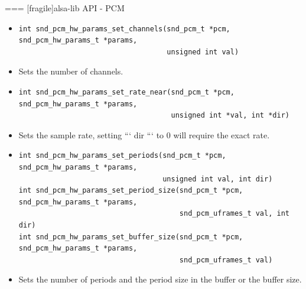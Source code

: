 === [fragile]{alsa-lib API - PCM}
  \begin{itemize}
  \item
    \begin{block}{}
    \fontsize{9}{9}\selectfont
      \begin{verbatim}
int snd_pcm_hw_params_set_channels(snd_pcm_t *pcm, snd_pcm_hw_params_t *params,
                                   unsigned int val)
      \end{verbatim}
    \end{block}
    \item Sets the number of channels.
  \item
    \begin{block}{}
    \fontsize{9}{9}\selectfont
      \begin{verbatim}
int snd_pcm_hw_params_set_rate_near(snd_pcm_t *pcm, snd_pcm_hw_params_t *params,
                                    unsigned int *val, int *dir)
      \end{verbatim}
    \end{block}
    \item Sets the sample rate, setting ``` dir ``` to 0 will require
      the exact rate.
  \item
    \begin{block}{}
    \fontsize{9}{9}\selectfont
      \begin{verbatim}
int snd_pcm_hw_params_set_periods(snd_pcm_t *pcm, snd_pcm_hw_params_t *params,
                                  unsigned int val, int dir)
int snd_pcm_hw_params_set_period_size(snd_pcm_t *pcm, snd_pcm_hw_params_t *params,
                                      snd_pcm_uframes_t val, int dir)
int snd_pcm_hw_params_set_buffer_size(snd_pcm_t *pcm, snd_pcm_hw_params_t *params,
                                      snd_pcm_uframes_t val)
      \end{verbatim}
    \end{block}
  \item Sets the number of periods and the period size in the
      buffer or the buffer size.
  \end{itemize}


